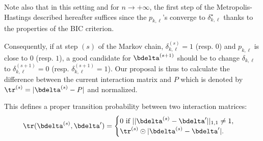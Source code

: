 Note also that in this setting and for $n \to +\infty$, the first step of the Metropolis-Hastings described hereafter suffices since the $p_{k,\ell}$'s converge to $\delta_{k,\ell}^\star$ thanks to the properties of the BIC criterion.

Consequently, if at step $(s)$ of the Markov chain, $\delta_{k,\ell}^{(s)} = 1$ (resp. $0$) and $p_{k,\ell}$ is close to $0$ (resp. $1$), a good candidate for $\bdelta^{(s+1)}$ should be to change $\delta_{k,\ell}$ to $\delta_{k,\ell}^{(s+1)} = 0$ (resp. $\delta_{k,\ell}^{(s+1)} = 1$). Our proposal is thus to calculate the difference between the current interaction matrix and $P$ which is denoted by $\tr^{(s)} = |\bdelta^{(s)} - P|$ and normalized.

This defines a proper transition probability between two interaction matrices:
\[ \tr(\bdelta^{(s)},\bdelta') = \begin{cases} 0 \text{ if } ||\bdelta^{(s)} - \bdelta'||_{1,1} \neq 1, \\ \tr^{(s)} \odot |\bdelta^{(s)} - \bdelta'|. \end{cases} \]

